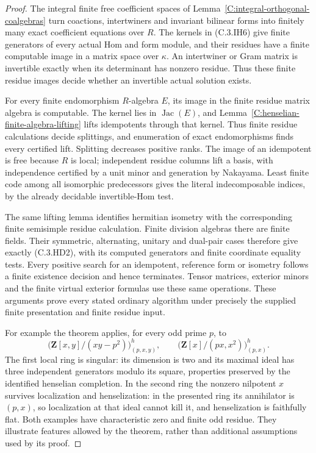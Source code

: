 \begin{proof}
The integral finite free coefficient spaces
of Lemma~\ref{C:integral-orthogonal-coalgebras} turn coactions,
intertwiners and invariant bilinear forms into finitely many exact
coefficient equations over $R$.
The kernels in (C.3.IH6) give finite generators of every actual Hom and
form module, and their residues have a finite computable image in a
matrix space over $\kappa$.
An intertwiner or Gram matrix is invertible exactly when its determinant
has nonzero residue.  Thus these finite residue images decide whether
an invertible actual solution exists.

For every finite endomorphism $R$-algebra $E$, its image in the finite
residue matrix algebra is computable.  The kernel lies in
$\operatorname{Jac}(E)$, and
Lemma~\ref{C:henselian-finite-algebra-lifting} lifts idempotents through
that kernel.  Thus finite residue calculations decide splittings,
and enumeration of exact endomorphisms finds every certified lift.
Splitting decreases positive ranks.  The image of an idempotent is free
because $R$ is local; independent residue columns lift a basis, with
independence certified by a unit minor and generation by Nakayama.
Least finite code among all isomorphic predecessors gives the literal
indecomposable indices, by the already decidable invertible-Hom test.

The same lifting lemma identifies hermitian isometry with the corresponding
finite semisimple residue calculation.  Finite division algebras there are
finite fields.  Their symmetric, alternating, unitary and dual-pair cases
therefore give exactly (C.3.HD2), with its computed generators and finite
coordinate equality tests.  Every positive search for an idempotent,
reference form or isometry follows a finite existence decision and hence
terminates.  Tensor matrices, exterior minors and the finite virtual
exterior formulas use these same operations.
These arguments prove every stated ordinary algorithm under precisely the
supplied finite presentation and finite residue input.

For example the theorem applies, for every odd prime $p$, to
\[
 \bigl(\mathbf Z[x,y]/(xy-p^2)\bigr)_{(p,x,y)}^h,
 \qquad
 \bigl(\mathbf Z[x]/(px,x^2)\bigr)_{(p,x)}^h.              \tag{C.3.IH7}
\]
The first local ring is singular: its dimension is two and its maximal
ideal has three independent generators modulo its square, properties
preserved by the identified henselian completion.
In the second ring the nonzero nilpotent $x$ survives localization and
henselization: in the presented ring its annihilator is $(p,x)$, so
localization at that ideal cannot kill it, and henselization is faithfully
flat.  Both examples have characteristic zero and finite odd residue.
They illustrate features allowed by the theorem, rather than additional
assumptions used by its proof.
\end{proof}
